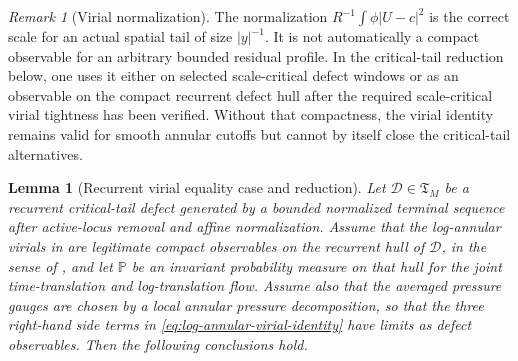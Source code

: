 \documentclass[11pt]{amsart}
\numberwithin{equation}{section}
\theoremstyle{plain}
\newtheorem{lemma}[theorem]{Lemma}
\theoremstyle{definition}
\theoremstyle{remark}
\newtheorem{remark}[theorem]{Remark}
\newcommand{\Tcrit}{\mathfrak T_M}
\begin{document}
\begin{remark}[Virial normalization]
\label{rem:virial-normalization-warning}
The normalization \(R^{-1}\int\phi |U-c|^2\) is the correct scale for an actual
spatial tail of size \(|y|^{-1}\).  It is not automatically a compact observable
for an arbitrary bounded residual profile.  In the critical-tail reduction
below, one uses it either on selected scale-critical defect windows or as an
observable on the compact recurrent defect hull after the required
scale-critical virial tightness has been verified.  Without that compactness,
the virial identity remains valid for smooth annular cutoffs but cannot by
itself close the critical-tail alternatives.
\end{remark}

\begin{lemma}[Recurrent virial equality case and reduction]
\label{lem:recurrent-virial-equality-routing}
Let \(\mathcal D\in\Tcrit\) be a recurrent critical-tail defect generated by a
bounded normalized terminal sequence after active-locus removal and affine
normalization.  Assume that the log-annular virials in
 are legitimate compact observables on
the recurrent hull of \(\mathcal D\), in the sense of
, and let \(\mathbb P\) be an invariant
probability measure on that hull for the joint time-translation and
log-translation flow.  Assume also that the averaged pressure gauges are chosen
by a local annular pressure decomposition, so that the three right-hand side
terms in \eqref{eq:log-annular-virial-identity} have limits as defect
observables.  Then the following conclusions hold.


\end{lemma}
\end{document}
